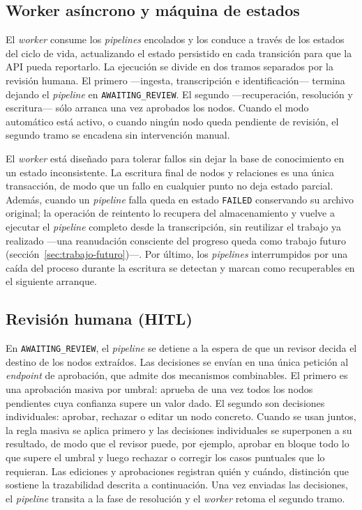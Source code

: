 \subsection{Worker asíncrono y máquina de estados}

El \textit{worker} consume los \textit{pipelines} encolados y los conduce a través de los estados
del ciclo de vida, actualizando el estado persistido en cada transición para que la \ac{API} pueda
reportarlo. La ejecución se divide en dos tramos separados por la revisión humana. El primero
—ingesta, transcripción e identificación— termina dejando el \textit{pipeline} en
\texttt{AWAITING\_REVIEW}. El segundo —recuperación, resolución y escritura— sólo arranca una vez
aprobados los nodos. Cuando el modo automático está activo, o cuando ningún nodo queda pendiente
de revisión, el segundo tramo se encadena sin intervención manual.

El \textit{worker} está diseñado para tolerar fallos sin dejar la base de conocimiento en un
estado inconsistente. La escritura final de nodos y relaciones es una única transacción, de modo
que un fallo en cualquier punto no deja estado parcial. Además, cuando un \textit{pipeline} falla
queda en estado \texttt{FAILED} conservando su archivo original; la operación de reintento lo
recupera del almacenamiento y vuelve a ejecutar el \textit{pipeline} completo desde la transcripción,
sin reutilizar el trabajo ya realizado —una reanudación consciente del progreso queda como trabajo
futuro (sección~\ref{sec:trabajo-futuro})—. Por último, los \textit{pipelines} interrumpidos por una
caída del proceso durante la escritura se detectan y marcan como recuperables en el siguiente arranque.

\subsection{Revisión humana (HITL)}

En \texttt{AWAITING\_REVIEW}, el \textit{pipeline} se detiene a la espera de que un revisor decida
el destino de los nodos extraídos. Las decisiones se envían en una única petición al
\textit{endpoint} de aprobación, que admite dos mecanismos combinables. El primero es una
aprobación masiva por umbral: aprueba de una vez todos los nodos pendientes cuya confianza supere
un valor dado. El segundo son decisiones individuales: aprobar, rechazar o editar un nodo concreto.
Cuando se usan juntos, la regla masiva se aplica primero y las decisiones individuales se superponen
a su resultado, de modo que el revisor puede, por ejemplo, aprobar en bloque todo lo que supere el
umbral y luego rechazar o corregir los casos puntuales que lo requieran. Las ediciones y aprobaciones
registran quién y cuándo, distinción que sostiene la trazabilidad descrita a continuación. Una vez
enviadas las decisiones, el \textit{pipeline} transita a la fase de resolución y el \textit{worker}
retoma el segundo tramo.

